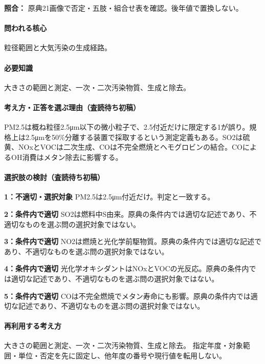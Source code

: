 \noindent\textbf{照合：} 原典21画像で否定・五肢・組合せ表を確認。後年値で置換しない。\par

\paragraph{問われる核心} 粒径範囲と大気汚染の生成経路。

\paragraph{必要知識} 大きさの範囲と測定、一次・二次汚染物質、生成と除去。

\paragraph{考え方・正答を選ぶ理由（査読待ち初稿）} PM2.5は概ね粒径2.5μm以下の微小粒子で、2.5付近だけに限定する1が誤り。規格上は2.5μmを50\%分離する装置で採取するという測定定義もある。SO2は硫黄、NOxとVOCは二次生成、COは不完全燃焼とヘモグロビンの結合。COによるOH消費はメタン除去に影響する。

\paragraph{選択肢の検討（査読待ち初稿）}\mbox{}\par

\noindent\textbf{1：不適切・選択対象} PM2.5は2.5μm付近だけ。判定と一致する。\par

\noindent\textbf{2：条件内で適切} SO2は燃料中S由来。原典の条件内では適切な記述であり、不適切なものを選ぶ問の選択対象ではない。\par

\noindent\textbf{3：条件内で適切} NO2は燃焼と光化学前駆物質。原典の条件内では適切な記述であり、不適切なものを選ぶ問の選択対象ではない。\par

\noindent\textbf{4：条件内で適切} 光化学オキシダントはNOxとVOCの光反応。原典の条件内では適切な記述であり、不適切なものを選ぶ問の選択対象ではない。\par

\noindent\textbf{5：条件内で適切} COは不完全燃焼でメタン寿命にも影響。原典の条件内では適切な記述であり、不適切なものを選ぶ問の選択対象ではない。\par

\paragraph{再利用する考え方} 大きさの範囲と測定、一次・二次汚染物質、生成と除去。 指定年度・対象範囲・単位・否定を先に固定し、他年度の番号や現行値を転用しない。

